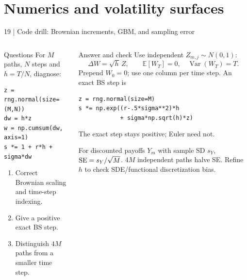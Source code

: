 \documentclass[handout,10pt,t,aspectratio=169]{beamer}
\newcommand{\E}{\mathbb E}
\newcommand{\Var}{\operatorname{Var}}
\newenvironment{questions}{\begin{block}{Questions}}{\end{block}}
\newenvironment{answers}{\begin{exampleblock}{Answer and check}}{\end{exampleblock}}
\newcommand{\compact}{\small%
 \setlength{\abovedisplayskip}{3pt}%
 \setlength{\belowdisplayskip}{3pt}%
 \setlength{\abovedisplayshortskip}{2pt}%
 \setlength{\belowdisplayshortskip}{2pt}%
 \setlength{\parskip}{2pt}}
\begin{document}
\section{Numerics and volatility surfaces}
\begin{frame}[fragile]{19 | Code drill: Brownian increments, GBM, and sampling error}
\compact
\begin{columns}[T,onlytextwidth]
\begin{questions}
For \(M\) paths, \(N\) steps and \(h=T/N\), diagnose:
\begin{lstlisting}
z = rng.normal(size=(M,N))
dw = h*z
w = np.cumsum(dw, axis=1)
s *= 1 + r*h + sigma*dw
\end{lstlisting}
\begin{enumerate}
\item Correct Brownian scaling and time-step indexing.
\item Give a positive exact BS step.
\item Distinguish \(4M\) paths from a smaller time step.
\end{enumerate}
\end{questions}
\begin{answers}
Use independent \(Z_{m,j}\sim N(0,1)\):
\[
 \Delta W=\sqrt h\,Z,\qquad
 \E[W_T]=0,\quad\Var(W_T)=T.
\]
Prepend \(W_0=0\); use one column per time step.
An exact BS step is
\begin{lstlisting}
z = rng.normal(size=M)
s *= np.exp((r-.5*sigma**2)*h
            + sigma*np.sqrt(h)*z)
\end{lstlisting}
The exact step stays positive; Euler need not.

For discounted payoffs \(Y_m\) with sample SD \(s_Y\),
\({\rm SE}=s_Y/\sqrt M\).
\(4M\) independent paths halve SE. Refine \(h\) to check
SDE/functional discretization bias.
\end{answers}
\end{columns}
\end{frame}
\end{document}

